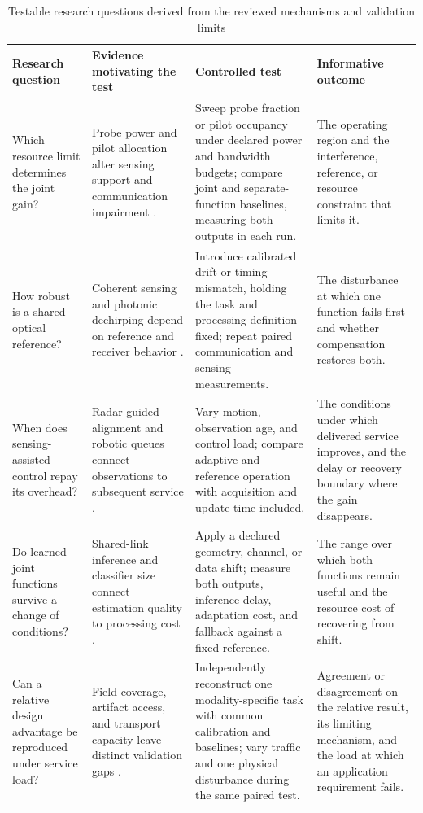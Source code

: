 \begin{table}[!t]
\caption{Testable research questions derived from the reviewed mechanisms and
validation limits}
\label{tab:research_roadmap}
\centering
\footnotesize
\setlength{\tabcolsep}{3pt}
\renewcommand{\arraystretch}{1.12}
\begin{tabularx}{\textwidth}{@{}
>{\raggedright\arraybackslash}p{}
>{\raggedright\arraybackslash}p{}
>{\raggedright\arraybackslash}p{}
>{\raggedright\arraybackslash}X@{}}
\toprule
Research question & Evidence motivating the test & Controlled test & Informative outcome \\
\midrule
Which resource limit determines the joint gain? & Probe power and pilot
allocation alter sensing support and communication impairment
\cite{OISAC_SCR00057,OISAC_SCR00007}. & Sweep probe fraction or pilot occupancy
under declared power and bandwidth budgets; compare joint and separate-function
baselines, measuring both outputs in each run. & The operating region and the
interference, reference, or resource constraint that limits it. \\
\addlinespace[2pt]
How robust is a shared optical reference? & Coherent sensing and photonic
dechirping depend on reference and receiver behavior
\cite{OISAC_SCR00647,OISAC_SCR01000}. & Introduce calibrated drift or timing
mismatch, holding the task and processing definition fixed; repeat paired
communication and sensing measurements. & The disturbance at which one
function fails first and whether compensation restores both. \\
\addlinespace[2pt]
When does sensing-assisted control repay its overhead? & Radar-guided alignment
and robotic queues connect observations to subsequent service
\cite{OISAC_SCR00502,OISAC_SCR00910}. & Vary motion, observation age, and control
load; compare adaptive and reference operation with acquisition and update
time included. & The conditions under which delivered service improves,
and the delay or recovery boundary where the gain disappears. \\
\addlinespace[2pt]
Do learned joint functions survive a change of conditions? & Shared-link
inference and classifier size connect estimation quality to processing cost
\cite{OISAC_SCR00949,OISAC_SCR01047}. & Apply a declared geometry, channel, or data
shift; measure both outputs, inference delay, adaptation cost, and fallback
against a fixed reference. & The range over which both functions remain useful
and the resource cost of recovering from shift. \\
\addlinespace[2pt]
Can a relative design advantage be reproduced under service load? & Field
coverage, artifact access, and transport capacity leave distinct validation
gaps \cite{OISAC_SCR00436,OISAC_SCR01049}. & Independently reconstruct one
modality-specific task with common calibration and baselines; vary traffic
and one physical disturbance during the same paired test. & Agreement or
disagreement on the relative result, its limiting mechanism, and the load
at which an application requirement fails. \\
\bottomrule
\end{tabularx}
\end{table}

